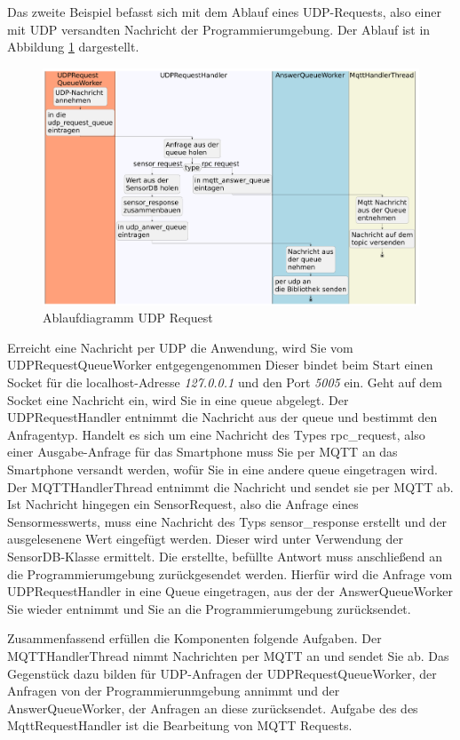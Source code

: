 \documentclass[11pt,a4paper]{report}
\begin{document}
Das zweite Beispiel befasst sich mit dem Ablauf eines UDP-Requests, also einer mit UDP versandten Nachricht der Programmierumgebung.
Der Ablauf ist in Abbildung \ref{fig:serverUDPReqPath} dargestellt.
\begin{figure}[htbp]
  \centering
  \includegraphics[width=\textwidth]{images/UDPRequestServerPath}
  \caption{Ablaufdiagramm UDP Request}
  \label{fig:serverUDPReqPath}
\end{figure}
Erreicht eine Nachricht per UDP die Anwendung, wird Sie vom UDPRequestQueueWorker entgegengenommen
Dieser bindet beim Start einen Socket für die localhost-Adresse \textit{127.0.0.1} und den Port \textit{5005}  ein.
Geht auf dem Socket eine Nachricht ein, wird Sie in eine queue abgelegt.
Der UDPRequestHandler entnimmt die Nachricht aus der queue und bestimmt den Anfragentyp.
Handelt es sich um eine Nachricht des Types rpc\_request, also einer Ausgabe-Anfrage für das Smartphone muss Sie per MQTT an das Smartphone versandt werden, wofür Sie in eine andere queue eingetragen wird.
Der MQTTHandlerThread entnimmt die Nachricht und sendet sie per MQTT ab.
Ist Nachricht hingegen ein SensorRequest, also die Anfrage eines Sensormesswerts, muss eine Nachricht des Typs sensor\_response erstellt und der ausgelesenene Wert eingefügt werden.
Dieser wird unter Verwendung der SensorDB-Klasse ermittelt.
Die erstellte, befüllte Antwort muss anschließend an die Programmierumgebung zurückgesendet werden.
Hierfür wird die Anfrage vom UDPRequestHandler in eine Queue eingetragen, aus der der AnswerQueueWorker Sie wieder entnimmt und Sie an die Programmierumgebung zurücksendet.

Zusammenfassend erfüllen die Komponenten folgende Aufgaben.
Der MQTTHandlerThread nimmt Nachrichten per MQTT an und sendet Sie ab.
Das Gegenstück dazu bilden für UDP-Anfragen der UDPRequestQueueWorker, der Anfragen von der Programmierunmgebung annimmt und der AnswerQueueWorker, der Anfragen an diese zurücksendet.
Aufgabe des des MqttRequestHandler ist die Bearbeitung von MQTT Requests.
\end{document}
